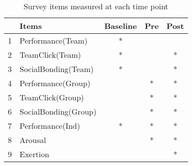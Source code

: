 \begin{table}[ht]
\centering
\begin{tabular}{llccc}
  \hline
 & Items & Baseline & Pre & Post \\ 
  \hline
1 & Performance(Team) & * &  &  \\ 
  2 & TeamClick(Team) & * &  & * \\ 
  3 & SocialBonding(Team) & * &  & * \\ 
  4 & Performance(Group) &  & * & * \\ 
  5 & TeamClick(Group) &  & * & * \\ 
  6 & SocialBonding(Group) &  & * & * \\ 
  7 & Performance(Ind) & * & * & * \\ 
  8 & Arousal &  & * & * \\ 
  9 & Exertion &  &  & * \\ 
   \hline
\end{tabular}
\caption{Survey items measured at each time point} 
\label{tab:surveyItemsByTime}
\end{table}
